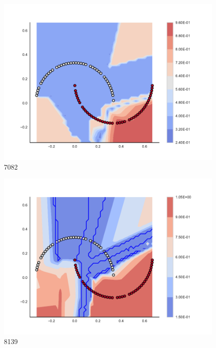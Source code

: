 \begin{subfigure}[b]{0.09\textwidth}
    \includegraphics[clip, trim=2.35cm 1.75cm 4.5cm 0cm,width=\textwidth]{img/convergence/7082.pdf}
    \caption{7082}
    \label{fig:convergence_7082}
\end{subfigure}
%
\begin{subfigure}[b]{0.09\textwidth}
    \includegraphics[clip, trim=2.35cm 1.75cm 4.5cm 0cm,width=\textwidth]{img/convergence/8139.pdf}
    \caption{8139}
    \label{fig:convergence_8139}
\end{subfigure}
%
